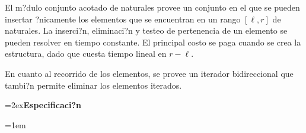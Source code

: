 \documentclass[a4paper,10pt]{article}
\begin{document}
El m?dulo conjunto acotado de naturales provee un conjunto en el que se pueden insertar ?nicamente los elementos que se encuentran en un rango $[\ell, r]$ de naturales.  La inserci?n, eliminaci?n y testeo de pertenencia de un elemento se pueden resolver en tiempo constante.  El principal costo se paga cuando se crea la estructura, dado que cuesta tiempo lineal en $r - \ell$.

En cuanto al recorrido de los elementos, se provee un iterador bidireccional que tambi?n permite eliminar los elementos iterados.

{\parskip=2ex\noindent\Large \textbf{Especificaci?n}\par}

\begin{tad}{}
  \parskip=0pt

  {
  \tadAnchoEncabezados=1em
  }

  \tadObservadores

  \tadGeneradores

  \tadOtrasOperaciones
  \tadNoAlinearFunciones

  \tadAxiomas
\end{tad}
\end{document}
